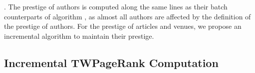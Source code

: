 .  
The prestige of authors is computed along the same lines as their batch counterparts of algorithm \batensemble,
as almost all authors are affected  by the definition of the prestige of authors.
%
For the prestige of articles and venues, we propose an incremental algorithm to maintain their prestige.

 
 




\subsection{Incremental TWPageRank Computation}
\label{subsec-incTWPageRank-computation}



